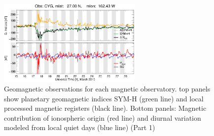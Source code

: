 \documentclass[a4paper]{article}
\theoremstyle{plain}
\theoremstyle{definition}
\begin{document}
\begin{figure}
	\includegraphics[width=7.0cm]{fig/magdata/cyg_2015-03-15_2015-03-28.eps}
	\caption{Geomagnetic observations for each magnetic observatory. top panels show planetary geomagnetic indices SYM-H (green line) and local processed magnetic registers (black line). Bottom panels: Magnetic contribution of ionospheric origin (red line) and diurnal variation modeled from local quiet days (blue line) (Part 1)}
	\label{fig:magdata}
\end{figure}
\end{document}

